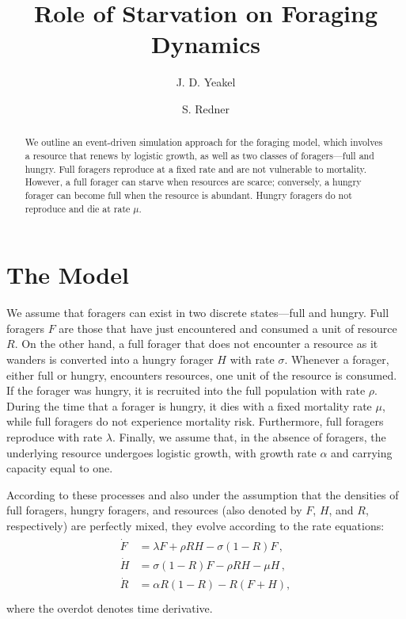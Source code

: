 \documentclass[11pt]{iopart}
\begin{document}
\title{Role of Starvation on Foraging Dynamics}


\author{J. D. Yeakel} \address{Santa Fe Institute, 1399 Hyde Park Road, Santa Fe, New
  Mexico 87501, USA}

\author{S. Redner} \address{Santa Fe Institute, 1399 Hyde Park Road, Santa Fe, New
  Mexico 87501, USA}

\begin{abstract}

  We outline an event-driven simulation approach for the foraging model,
  which involves a resource that renews by logistic growth, as well as two
  classes of foragers---full and hungry.  Full foragers reproduce at a fixed
  rate and are not vulnerable to mortality.  However, a full forager can
  starve when resources are scarce; conversely, a hungry forager can become
  full when the resource is abundant.  Hungry foragers do not reproduce and
  die at rate $\mu$.
\end{abstract}


\section{The Model}

We assume that foragers can exist in two discrete states---full and hungry.
Full foragers $F$ are those that have just encountered and consumed a unit of
resource $R$.  On the other hand, a full forager that does not encounter
a resource as it wanders is converted into a hungry forager $H$ with rate
$\sigma$.  Whenever a forager, either full or hungry, encounters resources,
one unit of the resource is consumed.  If the forager was hungry, it is
recruited into the full population with rate $\rho$.  During the time
that a forager is hungry, it dies with a fixed mortality rate $\mu$, while
full foragers do not experience mortality risk.  Furthermore, full
foragers reproduce with rate $\lambda$.  Finally, we assume that, in the
absence of foragers, the underlying resource undergoes logistic growth, with
growth rate $\alpha$ and carrying capacity equal to one.

According to these processes and also under the assumption that the densities
of full foragers, hungry foragers, and resources (also denoted by $F$,
$H$, and $R$, respectively) are perfectly mixed, they evolve according to the
rate equations:
\begin{align}
  \label{RE}
\begin{split}
\dot F &= \lambda F + \rho  RH - \sigma (1-R)F\,,\\
\dot H &= \sigma (1-R)F - \rho RH - \mu H\,, \\
\dot R &= \alpha R(1-R) -  R(F+H),\\
\end{split}
\end{align}
where the overdot denotes time derivative.
\end{document}
